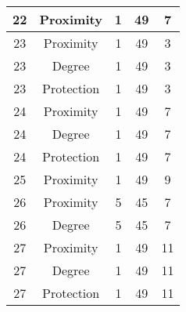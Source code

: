 \documentclass[results.tex]{subfiles}
\begin{document}
\begin{center}
\begin{tabular}{| c || c | c | c | c |}
            \hline
            22                      & Proximity                    & 1                      & 49                      & 7                    \\
            \hline
            23                      & Proximity                    & 1                      & 49                      & 3                    \\
            \hline
            23                      & Degree                       & 1                      & 49                      & 3                    \\
            \hline
            23                      & Protection                   & 1                      & 49                      & 3                    \\
            \hline
            24                      & Proximity                    & 1                      & 49                      & 7                    \\
            \hline
            24                      & Degree                       & 1                      & 49                      & 7                    \\
            \hline
            24                      & Protection                   & 1                      & 49                      & 7                    \\
            \hline
            25                      & Proximity                    & 1                      & 49                      & 9                    \\
            \hline
            26                      & Proximity                    & 5                      & 45                      & 7                    \\
            \hline
            26                      & Degree                       & 5                      & 45                      & 7                    \\
            \hline
            27                      & Proximity                    & 1                      & 49                      & 11                   \\
            \hline
            27                      & Degree                       & 1                      & 49                      & 11                   \\
            \hline
            27                      & Protection                   & 1                      & 49                      & 11                   \\

\end{tabular}
\end{center}
\end{document}

